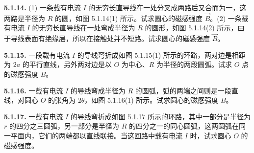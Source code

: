 \begin{center}
\end{center}

\vfill
\newpage

\textbf{5.1.14.} (1) 一条载有电流 $I$ 的无穷长直导线在一处分叉成两路后又合而为一，这两路是半径为 $R$ 的圆，如图 5.1.14(1) 所示。试求圆心的磁感强度 $\vec{B}$。(2) 一条载有电流 $I$ 的无穷长直导线在一处弯成半径为 $R$ 的圆形，如图 5.1.14(2) 所示，由于导线表面有绝缘层，所以在接触处并不短路。试求圆心的磁感强度 $\vec{B}$。

\begin{center}
  \begin{minipage}[b]{0.47\linewidth}
    \centering
  \end{minipage}\hfill
  \begin{minipage}[b]{0.47\linewidth}
    \centering
  \end{minipage}
\end{center}

\vfill
\newpage

\textbf{5.1.15.} 一段载有电流 $I$ 的导线弯折成如图 5.1.15(1) 所示的环路，两对边是相距为 $2a$ 的平行直线，另外两对边是以 $O$ 为中心、$R$ 为半径的两段圆弧。试求 $O$ 点的磁感强度 $B$。

\begin{center}
\end{center}

\vfill
\newpage

\textbf{5.1.16.} 一载有电流 $I$ 的导线弯成半径为 $R$ 的圆弧，弧的两端之间则是一段直线，对圆心 $O$ 的张角为 $2\theta$，如图 5.1.16(1) 所示。试求圆心的磁感强度 $B$。

\begin{center}
\end{center}

\vfill
\newpage

\textbf{5.1.17.} 一载有电流 $I$ 的导线弯折成如图 5.1.17 所示的环路，其中一部分是半径为 $r$ 的四分之三圆弧，另一部分是半径为 $R$ 的四分之一的同心圆弧，这两圆弧在同一平面内，它们的两端都以直线联接。当这回路中载有电流 $I$ 时，试求圆心 $O$ 的磁感强度。

\begin{center}
\end{center}

